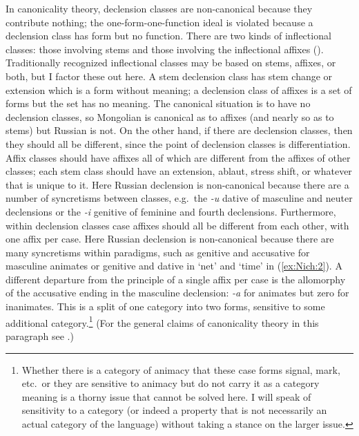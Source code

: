 \documentclass[output=collectionpaper]{langsci/langscibook}
\begin{document}
In canonicality theory, declension classes are non-canonical because they contribute nothing; the one-form-one-function ideal is violated because a declension class has form but no function. There are two kinds of inflectional classes: those involving stems and those involving the inflectional affixes (\citealt[184]{Bickel2007}). Traditionally recognized inflectional classes may be based on stems, affixes, or both, but I factor these out here.  A stem declension class has stem change or extension which is a form without meaning; a declension class of affixes is a set of forms but the set has no meaning. The canonical situation is to have no declension classes, so Mongolian is canonical as to affixes (and nearly so as to stems) but Russian is not. On the other hand, if there are declension classes, then they should all be different, since the point of declension classes is differentiation. Affix classes should have affixes all of which are different from the affixes of other classes; each stem class should have an extension, ablaut, stress shift, or whatever that is unique to it. Here Russian declension is non-canonical because there are a number of syncretisms between classes, e.g.\ the \textit{-u} dative of masculine and neuter declensions or the \textit{-i} genitive of feminine and fourth declensions. Furthermore, within declension classes case affixes should all be different from each other, with one affix per case. Here Russian declension is non-canonical because there are many syncretisms within paradigms, such as genitive and accusative for masculine animates or genitive and dative in `net' and `time' in (\ref{ex:Nich:2}). A different departure from the principle of a single affix per case is the allomorphy of the accusative ending in the masculine declension: \textit{-a} for animates but zero for inanimates. This is a split of one category into two forms, sensitive to some additional category.\footnote{%
Whether there is a category of animacy that these case forms signal, mark, etc.\ or they are sensitive to animacy but do not carry it as a category meaning is a thorny issue that cannot be solved here. I will speak of sensitivity to a category (or indeed a property that is not necessarily an actual category of the language) without taking a stance on the larger issue.
} %
(For the general claims of canonicality theory in this paragraph see \citealt{Corbett2007,Corbett2013c,Corbett2015}.)
\end{document}

